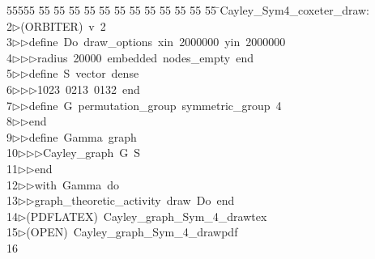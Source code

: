 %
%
\begin{tabbing}
55555 \= 55 \= 55 \= 55 \= 55 \= 55 \= 55 \= 55 \= 55 \= 55 \= 55 \= 55 \= 55 \= \>Cayley\_Sym4\_coxeter\_draw:\\[0pt]
2\>$\triangleright$\>(ORBITER)\ v\ 2\ \\[0pt]
3\>$\triangleright$\>$\triangleright$\>define\ Do\ draw\_options\ xin\ 2000000\ yin\ 2000000\ \\[0pt]
4\>$\triangleright$\>$\triangleright$\>$\triangleright$\>radius\ 20000\ embedded\ nodes\_empty\ end\ \\[0pt]
5\>$\triangleright$\>$\triangleright$\>define\ S\ vector\ dense\ \\[0pt]
6\>$\triangleright$\>$\triangleright$\>$\triangleright$\>1023\ 0213\ 0132\ end\ \\[0pt]
7\>$\triangleright$\>$\triangleright$\>define\ G\ permutation\_group\ symmetric\_group\ 4\ \\[0pt]
8\>$\triangleright$\>$\triangleright$\>end\ \\[0pt]
9\>$\triangleright$\>$\triangleright$\>define\ Gamma\ graph\ \\[0pt]
10\>$\triangleright$\>$\triangleright$\>$\triangleright$\>Cayley\_graph\ G\ S\ \\[0pt]
11\>$\triangleright$\>$\triangleright$\>end\ \\[0pt]
12\>$\triangleright$\>$\triangleright$\>with\ Gamma\ do\ \\[0pt]
13\>$\triangleright$\>$\triangleright$\>graph\_theoretic\_activity\ draw\ Do\ end\\[0pt]
14\>$\triangleright$\>(PDFLATEX)\ Cayley\_graph\_Sym\_4\_drawtex\\[0pt]
15\>$\triangleright$\>(OPEN)\ Cayley\_graph\_Sym\_4\_drawpdf\\[0pt]
16\>\end{tabbing}
